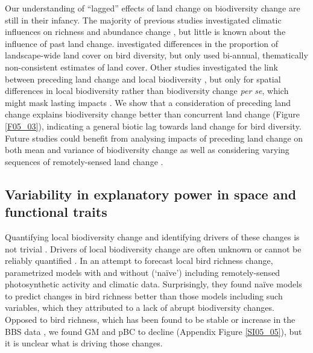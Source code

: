 Our understanding of “lagged” effects of land change on biodiversity change are still in their infancy. The majority of previous studies investigated climatic influences on richness and abundance change \citep{Albright2011,Lindstrom2013,Valtonen2013,Martay2017}, but little is known about the influence of past land change. \cite{Rittenhouse2012} investigated differences in the proportion of landscape-wide land cover on bird diversity, but only used bi-annual, thematically non-consistent estimates of land cover. Other studies investigated the link between preceding land change and local biodiversity \citep[Chapter \ref{C02}-\ref{C03} in this thesis, ][]{Jung2018}, but only for spatial differences in local biodiversity rather than biodiversity change \textit{per se}, which might mask lasting impacts \citep{Franca2016,DePalma2018}. We show that a consideration of preceding land change explains biodiversity change better than concurrent land change (Figure \ref{F05_03}), indicating a general biotic lag towards land change for bird diversity. Future studies could benefit from analysing impacts of preceding land change on both mean and variance of biodiversity change \citep{Leung2017,Christensen2018} as well as considering varying sequences of remotely-sensed land change \citep{Watson2014}.

\subsection{Variability in explanatory power in space and functional traits}
\label{C05_0403}

Quantifying local biodiversity change and identifying drivers of these changes is not trivial \citep{Dornelas2013,Cardinale2018}. Drivers of local biodiversity change are often unknown or cannot be reliably quantified \citep{Hallmann2017}. In an attempt to forecast local bird richness change, \cite{Harris2018} parametrized models with and without (‘na\"{i}ve’) including remotely-sensed photosynthetic activity and climatic data. Surprisingly, they found na\"{i}ve models to predict changes in bird richness better than those models including such variables, which they attributed to a lack of abrupt biodiversity changes. Opposed to bird richness, which has been found to be stable or increase in the BBS data \citep{Schipper2016}, we found GM and pBC to decline (Appendix Figure \ref{SI05_05}), but it is unclear what is driving those changes.

